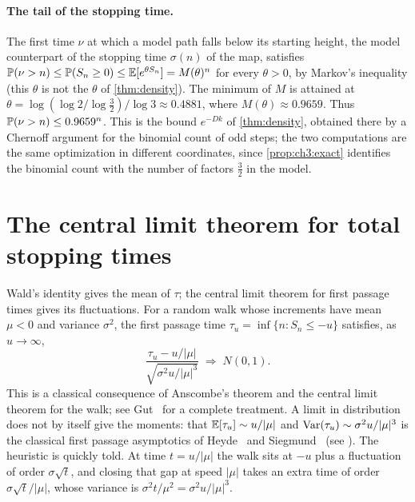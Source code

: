 \paragraph{The tail of the stopping time.} The first time $\nu$ at which a
model path falls below its starting height, the model counterpart of the
stopping time $\sigma(n)$ of the map, satisfies
$\mathbb{P}(\nu>n)\le\mathbb{P}(S_n\ge0)\le\mathbb{E}[e^{\theta S_n}]=M(\theta)^n$ for every
$\theta>0$, by Markov's inequality (this $\theta$ is not the $\theta$ of \cref{thm:density}). The minimum of $M$ is attained at
$\theta=\log(\log2/\log\frac32)/\log3\approx0.4881$, where
$M(\theta)\approx0.9659$. Thus $\mathbb{P}(\nu>n)\le0.9659^n$. This is the bound
$e^{-Dk}$ of \cref{thm:density}, obtained there by a Chernoff argument for the
binomial count of odd steps; the two computations are the same optimization in
different coordinates, since \cref{prop:ch3:exact} identifies the binomial
count with the number of factors $\tfrac32$ in the model.

\section{The central limit theorem for total stopping times}\label{sec:ch3:clt}

Wald's identity gives the mean of $\tau$; the central limit theorem for first
passage times gives its fluctuations. For a random walk whose increments have
mean $\mu<0$ and variance $\sigma^2$, the first passage time
$\tau_u=\inf\{n:S_n\le-u\}$ satisfies, as $u\to\infty$,
\begin{equation}\label{eq:ch3:clt}
  \frac{\tau_u-u/|\mu|}{\sqrt{\sigma^2u/|\mu|^3}}\;\Longrightarrow\;N(0,1).
\end{equation}
This is a classical consequence of Anscombe's theorem and the central limit
theorem for the walk; see Gut~\cite{gut1988} for a complete treatment. A limit
in distribution does not by itself give the moments: that $\mathbb{E}[\tau_u]\sim u/|\mu|$
and $\operatorname{Var}(\tau_u)\sim\sigma^2u/|\mu|^3$ is the classical first passage
asymptotics of Heyde~\cite{heyde1967} and
Siegmund~\cite{siegmund1969} (see
\cite[Theorem~III.9.1]{gut1988}). The
heuristic is quickly told. At time $t=u/|\mu|$ the walk sits at $-u$ plus a
fluctuation of order $\sigma\sqrt t$, and closing that gap at speed $|\mu|$
takes an extra time of order $\sigma\sqrt t/|\mu|$, whose variance is
$\sigma^2t/\mu^2=\sigma^2u/|\mu|^3$.

